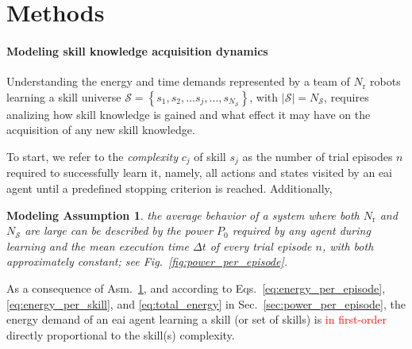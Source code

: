 \documentclass[12pt]{article}
\newcommand\myhl[1]{\textcolor{red}{#1}}
\renewcommand{\emph}[1]{\textit{#1}}
\newtheorem{assumption}{Modeling Assumption}
\begin{document}
\section*{Methods}\label{sec:methods}

\paragraph*{Modeling skill knowledge acquisition dynamics}\label{sec:knowledge_dynamics_model}
Understanding the energy and time demands represented by a team of $N_\mathrm{r}$ robots learning a skill universe $\mathcal{S}=\left\lbrace s_1,s_2,\ldots s_j,\ldots, s_{N_\mathcal{S}}\right\rbrace$, with $|\mathcal{S}| = N_\mathcal{S}$, requires analizing how skill knowledge is gained and what effect it may have on the acquisition of any new skill knowledge. 

To start, we refer to the \emph{complexity} $c_j$ of skill $ s_j $ as the number of trial episodes $n$ required to successfully learn it, namely, all actions and states visited by an \ac{eai} agent until a predefined stopping criterion is reached. Additionally,
\begin{tcolorbox}
	\begin{assumption}\label{assumption:power_and_episode_time}
		the average behavior of a system where both $N_\mathrm{r}$ and $N_\mathcal{S}$ are large can be described by the power $P_0$ required by any agent during learning and the mean execution time $\Delta t$ of every trial episode $n$, with both approximately constant; see Fig.~\ref{fig:power_per_episode}.
	\end{assumption}
\end{tcolorbox}
\noindent As a consequence of Asm.~\ref{assumption:power_and_episode_time}, and according to Eqs.~\eqref{eq:energy_per_episode},\eqref{eq:energy_per_skill}, and \eqref{eq:total_energy} in Sec.~\ref{sec:power_per_episode}, the energy demand of an \ac{eai} agent learning a skill (or set of skills) is \myhl{in first-order} directly proportional to the skill(s) complexity.
\end{document}
